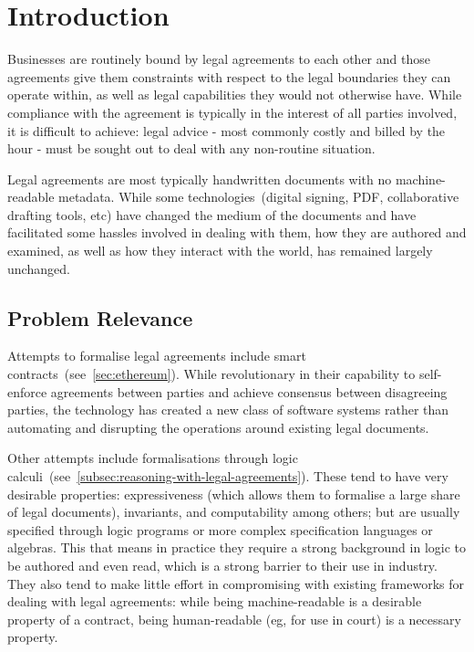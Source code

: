\chapter{Introduction}\label{ch:introduction}

Businesses are routinely bound by legal agreements to each other and those agreements give them constraints with respect to the legal boundaries they can operate within, as well as legal capabilities they would not otherwise have.
While compliance with the agreement is typically in the interest of all parties involved, it is
difficult to achieve: legal advice - most commonly costly and billed by the hour - must be sought
out to deal with any non-routine situation.

Legal agreements are most typically handwritten documents with no machine-readable metadata.
While some technologies~(digital signing, PDF, collaborative drafting tools, etc) have changed the medium of the documents and have facilitated some hassles involved in dealing with them, how they are authored and examined, as well as how they interact with the world, has remained largely unchanged.\\

\section*{Problem Relevance}\label{sec:problem-relevance}

Attempts to formalise legal agreements include smart contracts~(see~\autoref{sec:ethereum}).
While revolutionary in their capability to self-enforce agreements between parties and achieve consensus between disagreeing parties, the technology has created a new class of software systems rather than automating and disrupting the operations around existing legal documents.

Other attempts include formalisations through logic calculi~(see~\autoref{subsec:reasoning-with-legal-agreements}).
These tend to have very desirable properties: expressiveness (which allows them to formalise a large share of legal documents), invariants, and computability among others;
but are usually specified through logic programs or more complex specification languages or algebras.
This that means in practice they require a strong background in logic to be authored and even read, which is a strong barrier to their use in industry.
They also tend to make little effort in compromising with existing frameworks for dealing with legal agreements: while being machine-readable is a desirable property of a contract, being human-readable (eg, for use in court) is a necessary property.

